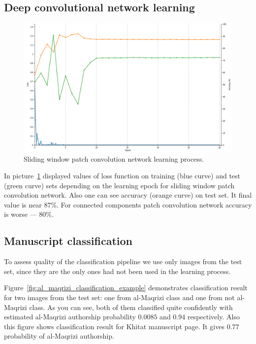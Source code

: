 \documentclass[conference,a4paper,twocolumn]{IEEEtran}
\begin{document}
\subsection{Deep convolutional network learning}

\begin{figure}[!ht]
\centering
\includegraphics[scale=0.2]{figures/alexnet_loss.png}
\caption{Sliding window patch convolution network learning process.}
\label{img_alexnet}
\end{figure}

In picture~\ref{img_alexnet} displayed values of loss function on training (blue curve) and test (green curve) sets depending on the learning epoch for sliding window patch convolution network. Also one can see accuracy (orange curve) on test set. It final value is near $87 \%$. For connected components patch convolution network accuracy is worse --- $80 \%$.    

\subsection{Manuscript classification}

To assess quality of the classification pipeline we use only images from the test set, since they are the only ones had not been used in the learning process. 

Figure~\ref{fig:al_maqrizi_classification_example} demonstrates classification result for two images from the test set: one from al-Maqrizi class and one from not al-Maqrizi class. As you can see, both of them classified quite confidently with estimated al-Maqrizi authorship probability $0.0085$ and $0.94$ respectively. Also this figure shows classification result for Khitat manuscript page. It gives $0.77$ probability of al-Maqrizi authorship.
\end{document}
